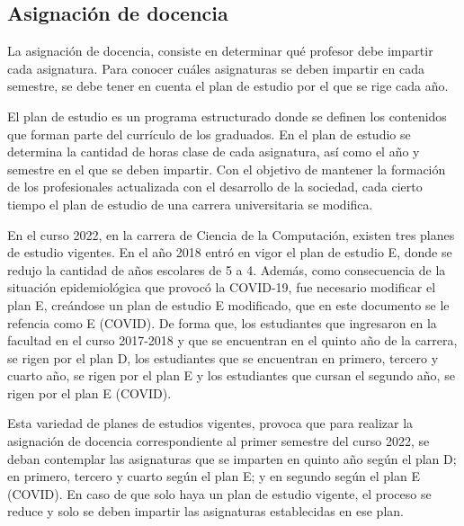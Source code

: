 





\subsection{Asignación de docencia}
La asignación de docencia, consiste en determinar qué profesor debe 
impartir cada asignatura. Para conocer cuáles asignaturas se deben impartir en 
cada semestre, se debe tener en cuenta el plan de estudio por el que se rige cada año.

El plan de estudio es un programa estructurado donde se definen los contenidos que forman parte del currículo de los 
graduados. En el plan de estudio se determina la cantidad de horas clase de cada asignatura, 
así como el año y semestre en el que se deben impartir.
Con el objetivo de mantener la formación de los profesionales actualizada con el desarrollo de la 
sociedad, cada cierto tiempo el plan de estudio de una carrera universitaria se modifica.

En el curso 2022, en la carrera de Ciencia de la Computación, existen tres planes de 
estudio vigentes. En el año 2018 entró en vigor el plan de estudio E, donde 
se redujo la cantidad de años escolares de 5 a 4. Además, como consecuencia de la 
situación epidemiológica que provocó la COVID-19, fue necesario modificar el 
plan E, creándose un plan de estudio E modificado, que en este documento se le refencia como 
E (COVID). De forma que, los estudiantes que ingresaron en la facultad en 
el curso 2017-2018 y que se encuentran en el quinto año de la carrera, se rigen por el plan D, 
los estudiantes que se encuentran en primero, tercero y cuarto año, se rigen por el plan E 
y los estudiantes que cursan el segundo año, se rigen por el plan E (COVID).

Esta variedad de planes de estudios vigentes, provoca que para realizar 
la asignación de docencia correspondiente al primer semestre del curso 2022, se deban 
contemplar las asignaturas que se imparten en quinto año según el plan D;
en primero, tercero y cuarto según el plan E; y en segundo según el plan 
E (COVID). En caso de que solo haya un plan de estudio vigente, el proceso se 
reduce y solo se deben impartir las asignaturas establecidas en ese plan.


